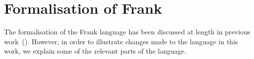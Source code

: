 \documentclass[msc,deptreport,cs]{infthesis} %
\begin{document}

\chapter{Formalisation of Frank}
\label{chap:formalisation}

The formalisation of the Frank language has been discussed at length in previous
work~(\cite{convent2020doo}). However, in order to illustrate changes made to
the language in this work, we explain some of the relevant parts of the
language.
\end{document}
